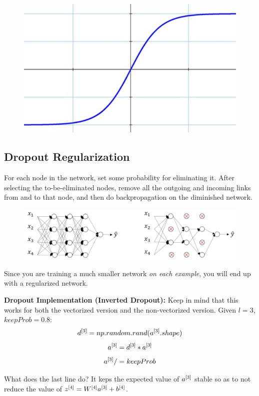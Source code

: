 \begin{figure}[H]
    \includegraphics[scale=0.2]{images/tanh.png}
    \centering
\end{figure}

\subsection{Dropout Regularization}
For each node in the network, set some probability for eliminating it. After selecting the to-be-eliminated nodes, remove all the outgoing and incoming links from and to that node, and then do backpropagation on the diminished network.

\begin{figure}[H]
    \includegraphics[scale=0.35]{images/dropout.png}
    \centering
\end{figure}

Since you are training a much smaller network \emph{on each example}, you will end up with a regularized network.

\textbf{Dropout Implementation (Inverted Dropout):} Keep in mind that this works for both the vectorized version and the non-vectorized version. Given $l=3$, $keepProb=0.8$: 
$$
d^{[3]} = np.random.rand(a^{[3]}.shape)
$$
$$
a^{[3]} = d^{[3]} \ast a^{[3]}
$$
$$
a^{[3]} /= keepProb
$$

What does the last line do? It keps the expected value of $a^{[3]}$ stable so as to not reduce the value of $z^{[4]} = W^{[4]}a^{[3]}+b^{[4]}$. 

